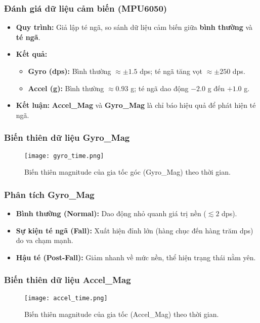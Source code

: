 \begin{frame}[fragile]
\frametitle{Đánh giá dữ liệu cảm biến (MPU6050)}
\begin{itemize}
    \item \textbf{Quy trình:} Giả lập té ngã, so sánh dữ liệu cảm biến giữa \textbf{bình thường} và \textbf{té ngã}.
    \item \textbf{Kết quả:}
    \begin{itemize}
        \item \textbf{Gyro (dps):} Bình thường $\approx \pm 1.5$ dps; té ngã tăng vọt $\approx \pm 250$ dps.
        \item \textbf{Accel (g):} Bình thường $\approx 0.93$ g; té ngã dao động $-2.0$ g đến $+1.0$ g.
    \end{itemize}
    \item \textbf{Kết luận:} \textbf{Accel\_Mag} và \textbf{Gyro\_Mag} là chỉ báo hiệu quả để phát hiện té ngã.
\end{itemize}
\end{frame}

\begin{frame}[fragile]
\frametitle{Biến thiên dữ liệu Gyro\_Mag}
\begin{figure}[H]
    \centering
    \texttt{[image: gyro\_time.png]}
    \caption{Biến thiên magnitude của gia tốc góc (Gyro\_Mag) theo thời gian.}
\end{figure}
\end{frame}

\begin{frame}[fragile]
\frametitle{Phân tích Gyro\_Mag}
\begin{itemize}
    \item \textbf{Bình thường (Normal):} Dao động nhỏ quanh giá trị nền ($\lesssim 2$ dps).
    \item \textbf{Sự kiện té ngã (Fall):} Xuất hiện đỉnh lớn (hàng chục đến hàng trăm dps) do va chạm mạnh.
    \item \textbf{Hậu té (Post-Fall):} Giảm nhanh về mức nền, thể hiện trạng thái nằm yên.
\end{itemize}
\end{frame}

\begin{frame}[fragile]
\frametitle{Biến thiên dữ liệu Accel\_Mag}
\begin{figure}[H]
    \centering
    \texttt{[image: accel\_time.png]}
    \caption{Biến thiên magnitude của gia tốc (Accel\_Mag) theo thời gian.}
\end{figure}
\end{frame}

